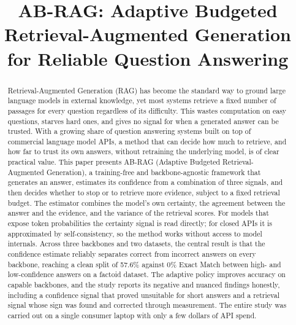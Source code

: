 \documentclass[conference,a4paper,10pt]{IEEEtran}
\begin{document}
\title{AB-RAG: Adaptive Budgeted Retrieval-Augmented Generation\\
for Reliable Question Answering}

\author{
	
	
}

\maketitle
\thispagestyle{plain}
\pagestyle{plain}

\begin{abstract}
Retrieval-Augmented Generation (RAG) has become the standard way to ground large
language models in external knowledge, yet most systems retrieve a fixed number of
passages for every question regardless of its difficulty. This wastes computation on
easy questions, starves hard ones, and gives no signal for when a generated answer
can be trusted. With a growing share of question answering systems built on top of
commercial language model APIs, a method that can decide how much to retrieve, and
how far to trust its own answers, without retraining the underlying model, is of
clear practical value. This paper presents AB-RAG (Adaptive Budgeted
Retrieval-Augmented Generation), a training-free and backbone-agnostic framework that
generates an answer, estimates its confidence from a combination of three signals,
and then decides whether to stop or to retrieve more evidence, subject to a fixed
retrieval budget. The estimator combines the model's own certainty, the agreement
between the answer and the evidence, and the variance of the retrieval scores. For
models that expose token probabilities the certainty signal is read directly; for
closed APIs it is approximated by self-consistency, so the method works without access
to model internals. Across three backbones and two datasets, the central result is
that the confidence estimate reliably separates correct from incorrect answers on
every backbone, reaching a clean split of 57.6\% against 0\% Exact Match between high-
and low-confidence answers on a factoid dataset. The adaptive policy improves accuracy
on capable backbones, and the study reports its negative and nuanced findings honestly,
including a confidence signal that proved unsuitable for short answers and a retrieval
signal whose sign was found and corrected through measurement. The entire study was
carried out on a single consumer laptop with only a few dollars of API spend.
\end{abstract}
\end{document}
